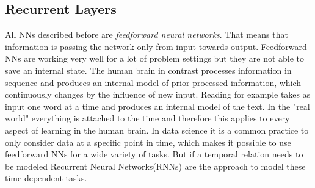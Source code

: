 \subsection{Recurrent Layers}
All NNs described before are \emph{feedforward neural networks}.
That means that information is passing the network only from input towards output.
Feedforward NNs are working very well for a lot of problem settings but they are not able to save an internal state.
The human brain in contrast processes information in sequence and produces an internal model of prior processed information, which continuously changes by the influence of new input.
Reading for example takes as input one word at a time and produces an internal model of the text.
In the "real world" everything is attached to the time and therefore this applies to every aspect of learning in the human brain. 
In data science it is a common practice to only consider data at a specific point in time, which makes it possible to use feedforward NNs for a wide variety of tasks.
But if a temporal relation needs to be modeled Recurrent Neural Networks(RNNs) are the approach to model these time dependent tasks.

